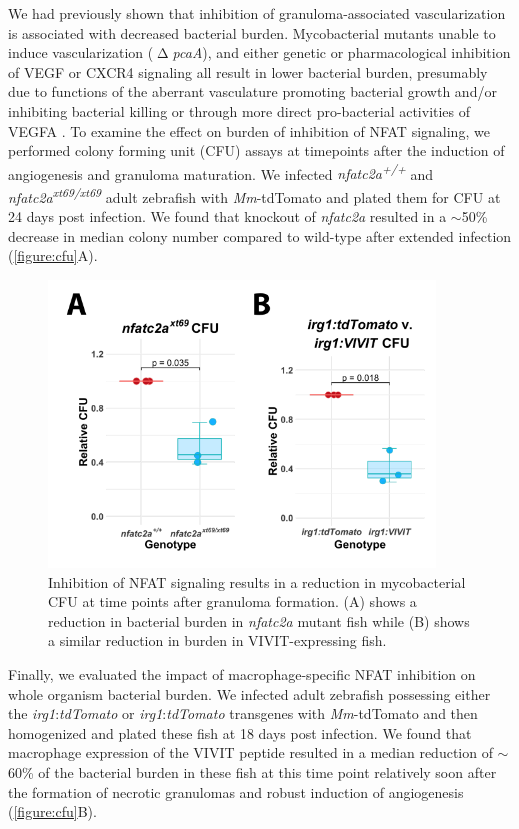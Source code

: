 We had previously shown that inhibition of granuloma\hyp{}associated vascularization is associated with decreased bacterial burden. Mycobacterial mutants unable to induce vascularization ($\upDelta$\textit{pcaA}), and either genetic or pharmacological inhibition of VEGF or CXCR4 signaling all result in lower bacterial burden, presumably due to functions of the aberrant vasculature promoting bacterial growth and/or inhibiting bacterial killing \citep{Rao2005, Glickman2000, Oehlers2015, Walton2018} or through more direct pro\hyp{}bacterial activities of VEGFA \citep{Harding2019}. To examine the effect on burden of inhibition of NFAT signaling, we performed colony forming unit (CFU) assays at timepoints after the induction of angiogenesis and granuloma maturation. We infected \textit{nfatc2a\textsuperscript{+/+}} and \textit{nfatc2a\textsuperscript{xt69/xt69}} adult zebrafish with \textit{Mm}\hyp{}tdTomato and plated them for CFU at 24 days post infection. We found that knockout of \textit{nfatc2a} resulted in a ${\sim}$50\% decrease in median colony number compared to wild\hyp{}type after extended infection (\autoref{figure:cfu}A). 

\begin{figure}
\centering
\includegraphics[height=3in]{images/cfu.pdf}
\caption{Inhibition of NFAT signaling results in a reduction in mycobacterial CFU at time points after granuloma formation. (A) shows a reduction in bacterial burden in \textit{nfatc2a} mutant fish while (B) shows a similar reduction in burden in VIVIT\hyp{}expressing fish.}
\label{figure:cfu}

\end{figure}

Finally, we evaluated the impact of macrophage\hyp{}specific NFAT inhibition on whole organism bacterial burden. We infected adult zebrafish possessing either the \textit{irg1}:\textit{tdTomato} or \textit{irg1}:\textit{tdTomato} transgenes with \textit{Mm}\hyp{}tdTomato and then homogenized and plated these fish at 18 days post infection. We found that macrophage expression of the VIVIT peptide resulted in a median reduction of ${\sim}$60\% of the bacterial burden in these fish at this time point relatively soon after the formation of necrotic granulomas and robust induction of angiogenesis (\autoref{figure:cfu}B).
 
